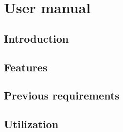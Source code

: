 \chapter{User manual}

\section{Introduction}

\section{Features}

\section{Previous requirements}

\section{Utilization}